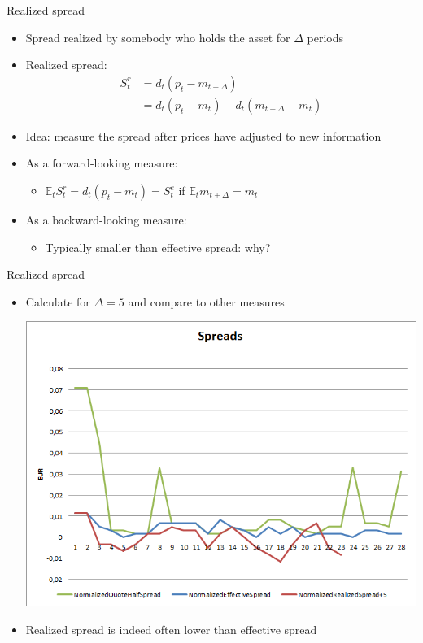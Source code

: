 \documentclass[english,10pt]{beamer}
\begin{document}
\begin{frame}{Realized spread}
	\begin{itemize}
		\item Spread realized by somebody who holds the asset for $\Delta$ periods
		\item \alert{Realized spread}:
		\begin{align*}
		S^r_t & = d_t(p_t - m_{t+\Delta}) \\
		& = d_t(p_t-m_t) - d_t(m_{t+\Delta}-m_t)
		\end{align*}
		\item Idea: measure the spread after prices have adjusted to new information
		\item As a forward-looking measure:
		\begin{itemize}
			\item $\mathbb{E}_t S_t^r = d_t(p_t - m_t) = S_t^e$ if $\mathbb{E}_t m_{t+\Delta} = m_t$
		\end{itemize}
		\item As a backward-looking measure:
		\begin{itemize}
			\item Typically smaller than effective spread: why?
		\end{itemize}
	\end{itemize}
\end{frame}


\begin{frame}{Realized spread}
	\begin{itemize}
		\item Calculate for $\Delta=5$ and compare to other measures
		\begin{center}
			\includegraphics[scale=0.39]{pics/L2_realizedspread}
		\end{center}
		\item Realized spread is indeed often lower than effective spread
	\end{itemize}
\end{frame}
\end{document}
